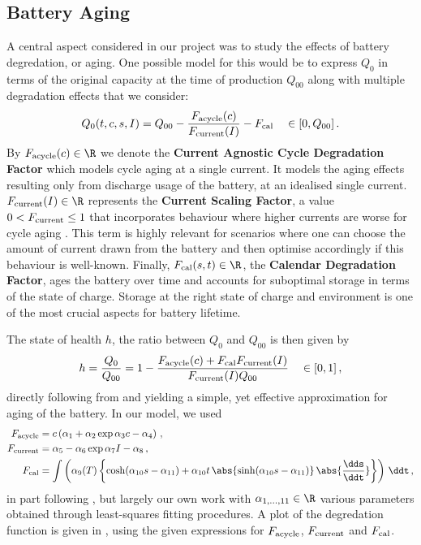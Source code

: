 \documentclass{prettytex/ox/mmsc-special-topic}
\begin{document}
  \subsection{Battery Aging}
  A central aspect considered in our project was to study the effects of battery degredation, or aging. One possible model for this would be to express $Q_0$ in terms of the original capacity at the time of production $Q_{00}$ along with multiple degradation effects that we consider:
  \begin{equation}
    \label{eq:cap}
    Q_0(t,c,s,I) = Q_{00} - \frac{F_{\rm acycle}(c)}{F_{\rm current}(I)} - F_{\rm cal} \quad \in [0, Q_{00}]\,.
  \end{equation}
  By $F_{\rm acycle}(c) \in \R$ we denote the \textbf{Current Agnostic Cycle Degradation Factor} which models cycle aging at a single current. It models the aging effects resulting only from discharge usage of the battery, at an idealised single current.
  $F_{\rm current}(I) \in \R$ represents the \textbf{Current Scaling Factor}, a value $0 < F_{\rm current} \leq 1$ that incorporates behaviour where higher currents are worse for cycle aging \parencite{csfpaper}. This term is highly relevant for scenarios where one can choose the amount of current drawn from the battery and then optimise accordingly if this behaviour is well-known.
  Finally, $F_{\rm cal}(s,t) \in \R$, the \textbf{Calendar Degradation Factor}, ages the battery over time and accounts for suboptimal storage in terms of the state of charge.
  Storage at the right state of charge and environment is one of the most crucial aspects for battery lifetime.

  The state of health $h$, the ratio between $Q_0$ and $Q_{00}$ is then given by
  $$h = \frac{Q_0}{Q_{00}} = 1 - \frac{F_{\rm acycle}(c) + F_{\rm cal} F_{\rm current}(I)}{F_{\rm current}(I) Q_{00}} \quad \in [0, 1]\,,$$
  directly following from  and yielding a simple, yet effective approximation for aging of the battery.
  In our model, we used
  \begin{align*}
    F_{\rm acycle}  & = c \left( \alpha_1 + \alpha_2 \exp{\alpha_3c-\alpha_4} \right)\,,                                                                                                                     \\
    F_{\rm current} & = \alpha_5 - \alpha_6 \exp{ \alpha_7 I - \alpha_8}\,,                                                                                                                                  \\
    F_{\rm cal}     & = \int \left( \alpha_9(T) \left\{\cosh({\alpha_{10}s - \alpha_{11}}) + \alpha_{10} t \, \abs{\sinh({\alpha_{10} s- \alpha_{11}})} \, \abs{ \frac{\dds}{\ddt}}\right\}\right) \,\ddt\,,
  \end{align*}
  in part following \cite{csfpaper}, but largely our own work
  with $\alpha_{1, ..., 11} \in \R$ various parameters obtained through least-squares fitting procedures.
  A plot of the degredation function is given in , using the given expressions for $F_{\rm acycle}$, $F_{\rm current}$ and $F_{\rm cal}$.
\end{document}
